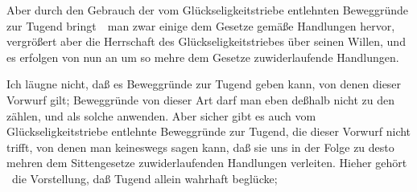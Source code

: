  Aber durch den Gebrauch der vom Glückseligkeitstriebe entlehnten Beweggründe zur Tugend bringt~\ man zwar einige dem Gesetze gemäße Handlungen hervor, vergrößert aber die Herrschaft des Glückseligkeitstriebes über seinen Willen, und es erfolgen von nun an um so mehre dem Gesetze zuwiderlaufende Handlungen.\par
{} Ich läugne nicht, daß es Beweggründe zur Tugend geben kann, von denen dieser Vorwurf gilt; Beweggründe von dieser Art darf man eben deßhalb nicht zu den  zählen, und als solche anwenden. Aber sicher gibt es auch  vom Glückseligkeitstriebe entlehnte Beweggründe zur Tugend, die dieser Vorwurf nicht trifft, von denen man keineswegs sagen kann, daß sie uns in der Folge zu desto mehren dem Sittengesetze zuwiderlaufenden Handlungen verleiten. Hieher gehört \zB\ die Vorstellung, daß Tugend allein wahrhaft beglücke; \uam

